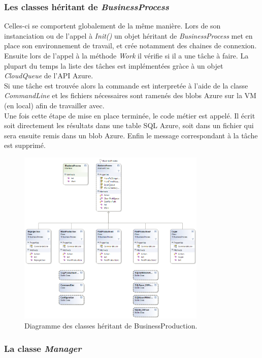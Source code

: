 \subsubsection{Les classes héritant de \textit{BusinessProcess}}
Celles-ci se comportent globalement de la même manière. Lors de son
instanciation ou de l'appel à \textit{Init()} un objet héritant de
\textit{BusinessProcess} met en place son environnement de travail, et
crée notamment des chaines de connexion. Ensuite lors de l'appel à la
méthode \textit{Work} il vérifie si il a une tâche à faire. La plupart
du temps la liste des tâches est implémentées gràce à un objet
\textit{CloudQueue} de l'API Azure. \\

Si une tâche est trouvée alors la commande est interpretée à l'aide de
la classe \textit{CommandLine} et les fichiers nécessaires sont
ramenés des blobs Azure sur la VM (en local) afin de travailler avec.\\

Une fois cette étape de mise en place terminée, le code métier est
appelé. Il écrit soit directement les résultats dans une table SQL
Azure, soit dans un fichier qui sera ensuite remis dans un blob Azure.
Enfin le message correspondant à la tâche est supprimé.

\begin{figure}[h!]
  \caption{Diagramme des classes héritant de BusinessProduction.}
  \centering
    \includegraphics[width=0.8\textwidth]{images/BusinessProduction2.png}
\end{figure}
\subsubsection{La classe \textit{Manager}}

